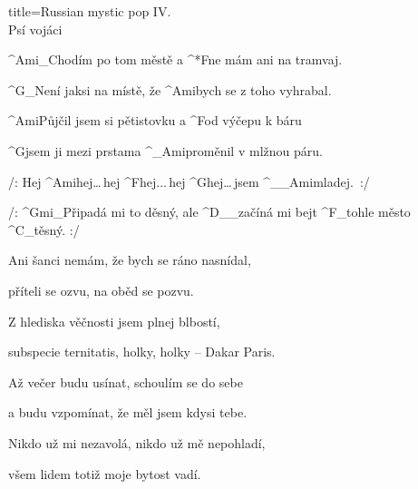 \begin{song}{title=\predtitle\centering Russian mystic pop IV. \\\large Psí vojáci  \vspace*{-0.3cm}}  %
\begin{centerjustified}
\nejnejvetsi

\sloka 
	^{Ami{\color{white}\_}}Chodím po tom městě a ^*{F\:}ne mám ani na tramvaj.
	
	^{G{\color{white}\_}}Není jaksi na místě, že ^{Ami}bych se z toho vyhrabal.
	
	^{Ami}Půjčil jsem si pětistovku a ^{F}od výčepu k báru
	
	^{G}jsem ji mezi prstama ^{{\color{white}\_}Ami}proměnil v mlžnou páru.
	
	/: Hej ^{Ami\phantom{dddd}}hej\elipsa\dots\,hej ^{F\phantom{dddd}}hej\elipsa.\elipsa.\elipsa.\,hej ^{G\phantom{dddddd}}hej\elipsa\dots\,jsem ^{{\color{white}\_\_}Ami\:\:}mladej.~:/
	
	 /: ^{Gmi{\color{white}\_}}Připadá mi to děsný, ale ^{D{\color{white}\_\_}}začíná mi bejt ^{F{\color{white}\_}}tohle město ^{C{\color{white}\_}}těsný. :/

\sloka
	Ani šanci nemám, že bych se ráno nasnídal,
	
	příteli se ozvu, na oběd se pozvu.
	
	Z hlediska věčnosti jsem plnej blbostí,
	
	subspecie ternitatis, holky, holky -- Dakar Paris.


\sloka
	Až večer budu usínat, schoulím se do sebe
	
	a budu vzpomínat, že měl jsem kdysi tebe.
	
	Nikdo už mi nezavolá, nikdo už mě nepohladí,
	
	všem lidem totiž moje bytost vadí.


\end{centerjustified}
\setcounter{Slokočet}{0}
\end{song}
